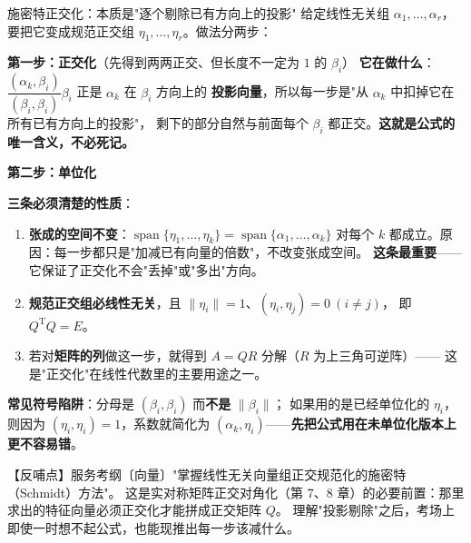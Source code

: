 \begin{fdeep}{施密特正交化：本质是"逐个剔除已有方向上的投影"}
给定线性无关组 $\alpha_1,\dots,\alpha_r$，要把它变成规范正交组 $\eta_1,\dots,\eta_r$。做法分两步：

\textbf{第一步：正交化}（先得到两两正交、但长度不一定为 $1$ 的 $\beta_i$）
\textbf{它在做什么}：$\dfrac{(\alpha_k,\beta_i)}{(\beta_i,\beta_i)}\beta_i$ 正是 $\alpha_k$ 在 $\beta_i$ 方向上的
\textbf{投影向量}，所以每一步是"从 $\alpha_k$ 中扣掉它在所有已有方向上的投影"，
剩下的部分自然与前面每个 $\beta_i$ 都正交。\textbf{这就是公式的唯一含义，不必死记。}

\textbf{第二步：单位化}

\textbf{三条必须清楚的性质}：
\begin{enumerate}[leftmargin=2.2em,itemsep=0.22em]
\item \textbf{张成的空间不变}：$\operatorname{span}\{\eta_1,\dots,\eta_k\}=\operatorname{span}\{\alpha_1,\dots,\alpha_k\}$
      对每个 $k$ 都成立。原因：每一步都只是"加减已有向量的倍数"，不改变张成空间。
      \textbf{这条最重要}——它保证了正交化不会"丢掉"或"多出"方向。
\item \textbf{规范正交组必线性无关}，且 $\lVert\eta_i\rVert=1$、$(\eta_i,\eta_j)=0\ (i\ne j)$，
      即 $Q^{\mathrm T}Q=E$。
\item 若对\textbf{矩阵的列}做这一步，就得到 $A=QR$ 分解（$R$ 为上三角可逆阵）——
      这是"正交化"在线性代数里的主要用途之一。
\end{enumerate}

\textbf{常见符号陷阱}：分母是 $(\beta_i,\beta_i)$ 而\textbf{不是} $\lVert\beta_i\rVert$；
如果用的是已经单位化的 $\eta_i$，则因为 $(\eta_i,\eta_i)=1$，系数就简化为
$(\alpha_k,\eta_i)$——\textbf{先把公式用在未单位化版本上更不容易错}。

【反哺点】服务考纲〔向量〕"掌握线性无关向量组正交规范化的施密特（Schmidt）方法"。
这是实对称矩阵正交对角化（第 7、8 章）的必要前置：那里求出的特征向量必须正交化才能拼成正交矩阵 $Q$。
理解"投影剔除"之后，考场上即使一时想不起公式，也能现推出每一步该减什么。
\end{fdeep}

